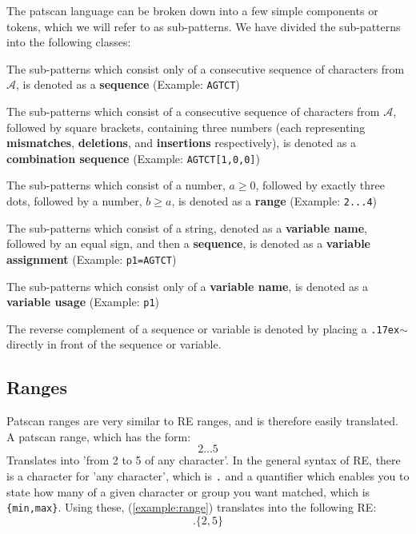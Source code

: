 \documentclass[12pt]{article}
\theoremstyle{definition}
\begin{document}
The patscan language can be broken down into a few simple components or tokens, which we will refer to as sub-patterns. We have divided the sub-patterns into the following classes:

The sub-patterns which consist only of a consecutive sequence of characters from $\mathcal{A}$, is denoted as a \textbf{sequence} (Example: \texttt{AGTCT})

The sub-patterns which consist of a consecutive sequence of characters from $\mathcal{A}$, followed by square brackets, containing three numbers (each representing \textbf{mismatches}, \textbf{deletions}, and \textbf{insertions} respectively), is denoted as a \textbf{combination sequence} (Example: \texttt{AGTCT[1,0,0]})

The sub-patterns which consist of a number, $a \geq 0$, followed by exactly three dots, followed by a number, $b \geq a$, is denoted as a \textbf{range} (Example: \texttt{2...4})

The sub-patterns which consist of a string, denoted as a \textbf{variable name}, followed by an equal sign, and then a \textbf{sequence}, is denoted as a \textbf{variable assignment} (Example: \texttt{p1=AGTCT})

The sub-patterns which consist only of a \textbf{variable name}, is denoted as a \textbf{variable usage} (Example: \texttt{p1})

The reverse complement of a sequence or variable is denoted by placing a \texttt{{\raise.17ex\hbox{$\scriptstyle\mathtt{\sim}$}}} directly in front of the sequence or variable.

\subsection{Ranges}

Patscan ranges are very similar to RE ranges, and is therefore easily translated. A patscan range, which has the form:
\begin{equation}
\label{example:range}
	2...5
\end{equation}
Translates into 'from 2 to 5 of any character'. In the general syntax of RE, there is a character for 'any character', which is \texttt{.} and a quantifier which enables you to state how many of a given character or group you want matched, which is \texttt{\{min,max\}}. Using these, (\ref{example:range}) translates into the following RE:
\begin{equation}
.\{2,5\}
\end{equation}
\end{document}
